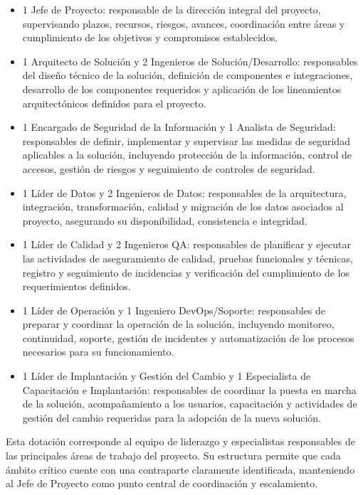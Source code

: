 \documentclass[11pt]{article}
\providecommand{\tightlist}{%
  \setlength{\itemsep}{0pt}\setlength{\parskip}{0pt}}
\begin{document}
\begin{itemize}
\tightlist
\item
  1 Jefe de Proyecto: responsable de la dirección integral del proyecto, supervisando plazos, recursos, riesgos, avances, coordinación entre áreas y cumplimiento de los objetivos y compromisos establecidos.
\item
  1 Arquitecto de Solución y 2 Ingenieros de Solución/Desarrollo: responsables del diseño técnico de la solución, definición de componentes e integraciones, desarrollo de los componentes requeridos y aplicación de los lineamientos arquitectónicos definidos para el proyecto.
\item
  1 Encargado de Seguridad de la Información y 1 Analista de Seguridad: responsables de definir, implementar y supervisar las medidas de seguridad aplicables a la solución, incluyendo protección de la información, control de accesos, gestión de riesgos y seguimiento de controles de seguridad.
\item
  1 Líder de Datos y 2 Ingenieros de Datos: responsables de la arquitectura, integración, transformación, calidad y migración de los datos asociados al proyecto, asegurando su disponibilidad, consistencia e integridad.
\item
  1 Líder de Calidad y 2 Ingenieros QA: responsables de planificar y ejecutar las actividades de aseguramiento de calidad, pruebas funcionales y técnicas, registro y seguimiento de incidencias y verificación del cumplimiento de los requerimientos definidos.
\item
  1 Líder de Operación y 1 Ingeniero DevOps/Soporte: responsables de preparar y coordinar la operación de la solución, incluyendo monitoreo, continuidad, soporte, gestión de incidentes y automatización de los procesos necesarios para su funcionamiento.
\item
  1 Líder de Implantación y Gestión del Cambio y 1 Especialista de Capacitación e Implantación: responsables de coordinar la puesta en marcha de la solución, acompañamiento a los usuarios, capacitación y actividades de gestión del cambio requeridas para la adopción de la nueva solución.
\end{itemize}

Esta dotación corresponde al equipo de liderazgo y especialistas responsables de las principales áreas de trabajo del proyecto. Su estructura permite que cada ámbito crítico cuente con una contraparte claramente identificada, manteniendo al Jefe de Proyecto como punto central de coordinación y escalamiento.
\end{document}
